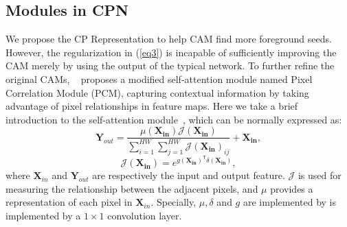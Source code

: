 \documentclass[10pt,twocolumn,letterpaper]{article}
\begin{document}
\subsection{Modules in CPN}
We propose the CP Representation to help CAM find more foreground seeds. However, the regularization in (\ref{eq3}) is incapable of sufficiently improving the CAM merely by using the output of the typical network. To further refine the original CAMs, ~\cite{seam} proposes a modified self-attention module named Pixel Correlation Module (PCM), capturing contextual information by taking advantage of pixel relationships in feature maps. Here we take a brief introduction to the self-attention module~\cite{nonlocal}, which can be normally expressed as:
 \begin{equation}\label{n1}
{\boldsymbol{Y}_{out}} = \frac{\mu(\boldsymbol{X_{in}}) \mathcal{J} (\boldsymbol{X_{in}})}{\sum\nolimits_{i = 1}^{HW} {\sum\nolimits_{j = 1}^{HW}\mathcal{J}(\boldsymbol{X_{in}})_{ij}}} + \boldsymbol{X_{in}},
\end{equation}
\begin{equation}\label{n2}
\mathcal{J}(\boldsymbol{X_{in}}) = e^{g(\boldsymbol{X_{in}})^\mathsf{T} \delta(\boldsymbol{X_{in}})},
\end{equation}
where $\boldsymbol{X}_{in}$ and $\boldsymbol{Y}_{out}$ are respectively the input and output feature. $\mathcal{J}$ is used for measuring the relationship between the adjacent pixels, and $\mu$ provides a representation of each pixel in $\boldsymbol{X}_{in}$. Specially, $\mu, \delta$ and $g$ are implemented by is implemented by a $1 \times 1$ convolution layer.
\end{document}
